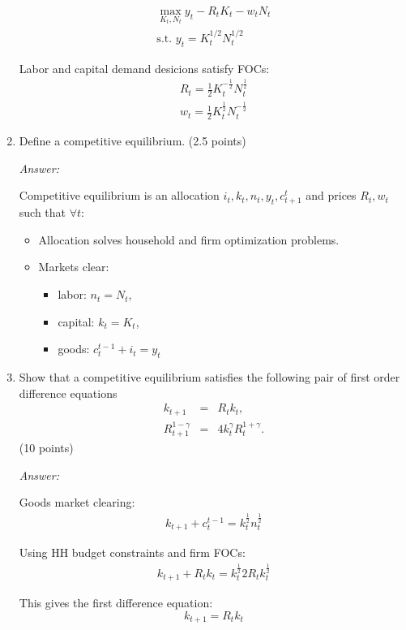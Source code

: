 \documentclass{article}
\begin{document}
\begin{enumerate}
\begin{gather*}
  \max_{K_t,N_t} y_t - R_tK_t-w_tN_t\\
\text{s.t. } y_t = K_{t}^{1/2}N_{t}^{1/2}
\end{gather*}

Labor and capital demand desicions satisfy FOCs:
\begin{eqnarray*}
  R_t=\frac{1}{2}K_t^{-\frac{1}{2}}N_t^{\frac{1}{2}}\\
  w_t=\frac{1}{2}K_t^{\frac{1}{2}}N_t^{-\frac{1}{2}}
\end{eqnarray*}

\item Define a competitive equilibrium. (2.5 points)

\textit{Answer:}

Competitive equilibrium is an allocation $i_t,k_t,n_t,y_t,c_{t+1}^t$ and prices $R_t,w_t$ such that $\forall t$:
\begin{itemize}
\item Allocation solves household and firm optimization problems.
\item Markets clear:
  \begin{itemize}
  \item labor: $n_t=N_t$,
  \item capital: $k_t=K_t$,
  \item goods: $c_t^{t-1}+i_t=y_t$
  \end{itemize}
\end{itemize}

\item Show that a competitive equilibrium satisfies the following pair of
first order difference equations%
\begin{eqnarray*}
k_{t+1} &=&R_{t}k_{t}, \\
R_{t+1}^{1-\gamma } &=&4k_{t}^{\gamma }R_{t}^{1+\gamma }.
\end{eqnarray*}%
(10 points)

\textit{Answer:}



Goods market clearing:
\begin{eqnarray*}
  k_{t+1}+c_t^{t-1}=k_t^{\frac{1}{2}}n_t^{\frac{1}{2}}
\end{eqnarray*}

Using HH budget constraints and firm FOCs:
\begin{eqnarray*}
  k_{t+1}+R_tk_t=k_t^{\frac{1}{2}}2R_tk_t^{\frac{1}{2}}
\end{eqnarray*}

This gives the first difference equation:
\begin{equation*}
  k_{t+1}=R_tk_t
\end{equation*}


\end{enumerate}
\end{document}

